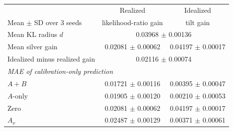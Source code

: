 \begin{tabular}{lcc}
\toprule
 & Realized & Idealized \\
Mean $\pm$ SD over 3 seeds & likelihood-ratio gain & tilt gain \\
\midrule
Mean KL radius $d$ & \multicolumn{2}{c}{0.03968 $\pm$ 0.00136} \\
Mean silver gain & 0.02081 $\pm$ 0.00062 & 0.04197 $\pm$ 0.00017 \\
Idealized minus realized gain & \multicolumn{2}{c}{0.02116 $\pm$ 0.00074} \\
\midrule
\multicolumn{3}{l}{\textit{MAE of calibration-only prediction}} \\
$A{+}B$ & 0.01721 $\pm$ 0.00116 & 0.00395 $\pm$ 0.00047 \\
$A$-only & 0.01905 $\pm$ 0.00120 & 0.00210 $\pm$ 0.00053 \\
Zero & 0.02081 $\pm$ 0.00062 & 0.04197 $\pm$ 0.00017 \\
$A_\nu$ & 0.02487 $\pm$ 0.00129 & 0.00371 $\pm$ 0.00061 \\
\bottomrule
\end{tabular}
